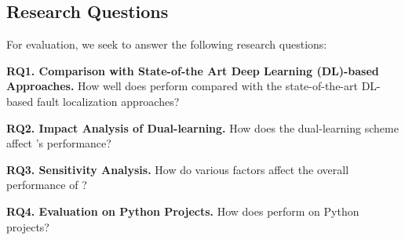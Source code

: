 \subsection{Research Questions}

For evaluation, we seek to answer the following research questions:

\noindent\textbf{RQ1. Comparison with State-of-the Art Deep Learning
  (DL)-based Approaches.}  How well does {\tool} perform compared with
the state-of-the-art DL-based fault localization approaches?

\noindent\textbf{RQ2. Impact Analysis of Dual-learning.} 
How does the dual-learning scheme affect {\tool}'s performance?

\noindent\textbf{RQ3. Sensitivity Analysis.} How do various factors affect the overall performance of {\tool}?


\noindent\textbf{RQ4. Evaluation on Python Projects.} How does {\tool}
perform on Python projects?
